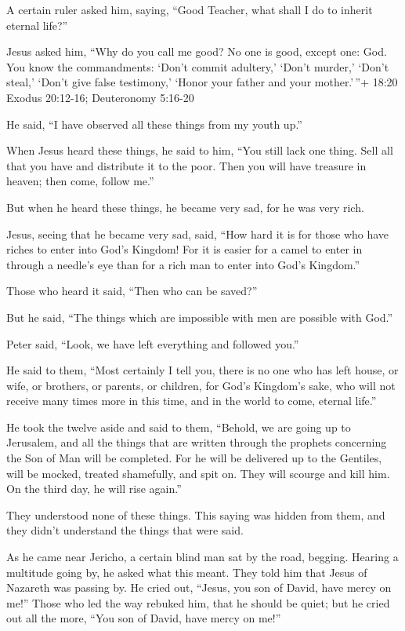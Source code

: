  A certain ruler asked him, saying, ``Good Teacher, what
shall I do to inherit eternal life?''

 Jesus asked him, ``Why do you call me good? No one is
good, except one: God.  You know the commandments: `Don't
commit adultery,' `Don't murder,' `Don't steal,' `Don't give false
testimony,' `Honor your father and your mother.'\,''+ 18:20 Exodus
20:12-16; Deuteronomy 5:16-20

 He said, ``I have observed all these things from my youth
up.''

 When Jesus heard these things, he said to him, ``You still
lack one thing. Sell all that you have and distribute it to the poor.
Then you will have treasure in heaven; then come, follow me.''

 But when he heard these things, he became very sad, for he
was very rich.

 Jesus, seeing that he became very sad, said, ``How hard it
is for those who have riches to enter into God's Kingdom! 
For it is easier for a camel to enter in through a needle's eye than for
a rich man to enter into God's Kingdom.''

 Those who heard it said, ``Then who can be saved?''

 But he said, ``The things which are impossible with men
are possible with God.''

 Peter said, ``Look, we have left everything and followed
you.''

 He said to them, ``Most certainly I tell you, there is no
one who has left house, or wife, or brothers, or parents, or children,
for God's Kingdom's sake,  who will not receive many times
more in this time, and in the world to come, eternal life.''

 He took the twelve aside and said to them, ``Behold, we
are going up to Jerusalem, and all the things that are written through
the prophets concerning the Son of Man will be completed. 
For he will be delivered up to the Gentiles, will be mocked, treated
shamefully, and spit on.  They will scourge and kill him.
On the third day, he will rise again.''

 They understood none of these things. This saying was
hidden from them, and they didn't understand the things that were said.

 As he came near Jericho, a certain blind man sat by the
road, begging.  Hearing a multitude going by, he asked what
this meant.  They told him that Jesus of Nazareth was
passing by.  He cried out, ``Jesus, you son of David, have
mercy on me!''  Those who led the way rebuked him, that he
should be quiet; but he cried out all the more, ``You son of David, have
mercy on me!''

